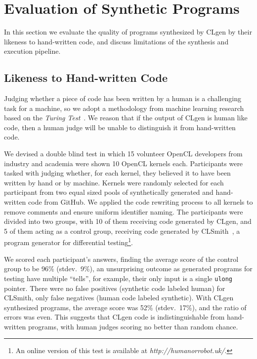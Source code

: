 \section{Evaluation of Synthetic Programs}\label{sec:eval}

In this section we evaluate the quality of programs synthesized by CLgen by their likeness to hand-written code, and discuss limitations of the synthesis and execution pipeline.

\subsection{Likeness to Hand-written Code}

Judging whether a piece of code has been written by a human is a challenging task for a machine, so we adopt a methodology from machine learning research based on the \emph{Turing Test}~\cite{Gao2015a,Zhang2016,Vinyals}. We reason that if the output of CLgen is human like code, then a human judge will be unable to distinguish it from hand-written code.

We devised a double blind test in which 15 volunteer OpenCL developers from industry and academia were shown 10 OpenCL kernels each. Participants were tasked with judging whether, for each kernel, they believed it to have been written by hand or by machine. Kernels were randomly selected for each participant from two equal sized pools of synthetically generated and hand-written code from GitHub. We applied the code rewriting process to all kernels to remove comments and ensure uniform identifier naming. The participants were divided into two groups, with 10 of them receiving code generated by CLgen, and 5 of them acting as a control group, receiving code generated by CLSmith~\cite{Lidbury2015a}, a program generator for differential testing\footnote{An online version of this test is available at \emph{http://humanorrobot.uk/}.}.

We scored each participant's answers, finding the average score of the control group to be 96\% (stdev.\ 9\%), an unsurprising outcome as generated programs for testing have multiple ``tells'', for example, their only input is a single \texttt{ulong} pointer. There were no false positives (synthetic code labeled human) for CLSmith, only false negatives (human code labeled synthetic). With CLgen synthesized programs, the average score was 52\% (stdev.\ 17\%), and the ratio of errors was even. This suggests that CLgen code is indistinguishable from hand-written programs, with human judges scoring no better than random chance.

